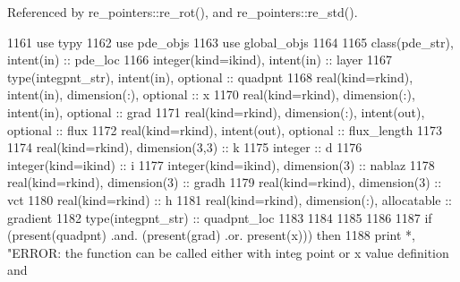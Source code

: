 Referenced by re\+\_\+pointers\+::re\+\_\+rot(), and re\+\_\+pointers\+::re\+\_\+std().


\begin{DoxyCode}
1161       \textcolor{keywordtype}{use }typy
1162       \textcolor{keywordtype}{use }pde_objs
1163       \textcolor{keywordtype}{use }global_objs
1164        
1165       \textcolor{keywordtype}{class}(pde_str), \textcolor{keywordtype}{intent(in)} :: pde\_loc
1166       \textcolor{keywordtype}{integer(kind=ikind)}, \textcolor{keywordtype}{intent(in)}                          :: layer
1167       \textcolor{keywordtype}{type}(integpnt_str), \textcolor{keywordtype}{intent(in)}, \textcolor{keywordtype}{optional} :: quadpnt    
1168       \textcolor{keywordtype}{real(kind=rkind)}, \textcolor{keywordtype}{intent(in)}, \textcolor{keywordtype}{dimension(:)}, \textcolor{keywordtype}{optional}              \textcolor{comment}{     :: x}
1170       \textcolor{keywordtype}{real(kind=rkind)}, \textcolor{keywordtype}{dimension(:)}, \textcolor{keywordtype}{intent(in)}, \textcolor{keywordtype}{optional}     :: grad
1171       \textcolor{keywordtype}{real(kind=rkind)}, \textcolor{keywordtype}{dimension(:)}, \textcolor{keywordtype}{intent(out)}, \textcolor{keywordtype}{optional}    :: flux
1172       \textcolor{keywordtype}{real(kind=rkind)}, \textcolor{keywordtype}{intent(out)}, \textcolor{keywordtype}{optional}                  :: flux\_length
1173 
1174       \textcolor{keywordtype}{real(kind=rkind)}, \textcolor{keywordtype}{dimension(3,3)}  :: k
1175       \textcolor{keywordtype}{integer}                           :: d
1176       \textcolor{keywordtype}{integer(kind=ikind)}               :: i
1177       \textcolor{keywordtype}{integer(kind=ikind)}, \textcolor{keywordtype}{dimension(3)} :: nablaz
1178       \textcolor{keywordtype}{real(kind=rkind)}, \textcolor{keywordtype}{dimension(3)}  :: gradh
1179       \textcolor{keywordtype}{real(kind=rkind)}, \textcolor{keywordtype}{dimension(3)}  :: vct
1180       \textcolor{keywordtype}{real(kind=rkind)} :: h
1181       \textcolor{keywordtype}{real(kind=rkind)}, \textcolor{keywordtype}{dimension(:)}, \textcolor{keywordtype}{allocatable} :: gradient
1182       \textcolor{keywordtype}{type}(integpnt_str) :: quadpnt\_loc
1183       
1184 
1185       
1186       
1187       \textcolor{keywordflow}{if} (\textcolor{keyword}{present}(quadpnt) .and. (\textcolor{keyword}{present}(grad) .or. \textcolor{keyword}{present}(x))) \textcolor{keywordflow}{then}
1188         print *, \textcolor{stringliteral}{"ERROR: the function can be called either with integ point or x value definition and
}
\end{DoxyCode}
